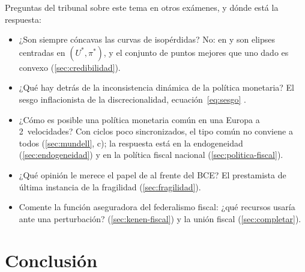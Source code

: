 \documentclass[11pt]{article}
\begin{document}
\begin{notaopositor}
Preguntas del tribunal sobre este tema en otros exámenes, y dónde está la respuesta:
\begin{itemize}
\item ¿Son siempre cóncavas las curvas de isopérdidas? No: en  y  son elipses centradas en $(U^*,\pi^*)$, y el conjunto de puntos mejores que uno dado es convexo (\ref{sec:credibilidad}).
\item ¿Qué hay detrás de la inconsistencia dinámica de la política monetaria? El sesgo inflacionista de la discrecionalidad, ecuación~\eqref{eq:sesgo} .
\item ¿Cómo es posible una política monetaria común en una Europa a 2~velocidades? Con ciclos poco sincronizados, el tipo común no conviene a todos (\ref{sec:mundell}, c); la respuesta está en la endogeneidad (\ref{sec:endogeneidad}) y en la política fiscal nacional (\ref{sec:politica-fiscal}).
\item ¿Qué opinión le merece el papel de  al frente del BCE? El prestamista de última instancia de la fragilidad (\ref{sec:fragilidad}).
\item Comente la función aseguradora del federalismo fiscal: ¿qué recursos usaría ante una perturbación?  (\ref{sec:kenen-fiscal}) y la unión fiscal (\ref{sec:completar}).
\end{itemize}
\end{notaopositor}


\section*{Conclusión}
\end{document}

